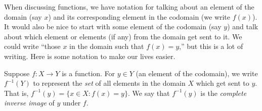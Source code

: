 \documentclass[10pt,]{book}
\theoremstyle{plain}
\theoremstyle{definition}
\theoremstyle{definition}
\theoremstyle{definition}
\numberwithin{equation}{section}
\def\inv{^{-1}}
\def\st{:}
\begin{document}
When discussing functions, we have notation for talking about an element of the domain (say \(x\)) and its corresponding element in the codomain (we write \(f(x)\)). It would also be nice to start with some element of the codomain (say \(y\)) and talk about which element or elements (if any) from the domain get sent to it. We could write ``those \(x\) in the domain such that \(f(x) = y\),'' but this is a lot of writing. Here is some notation to make our lives easier.
%
\par

Suppose \(f:X \to Y\) is a function. For \(y \in Y\) (an element of the codomain), we write \(f\inv(Y)\)\index{\(f\inv(Y)\)} to represent the \emph{set} of all elements in the domain \(X\) which get sent to \(y\). That is, \(f\inv(y) = \{x \in X \st f(x) = y\}\). We say that \(f\inv(y)\) is the \emph{complete inverse image} of \(y\) under \(f\).
%
\par
\end{document}
